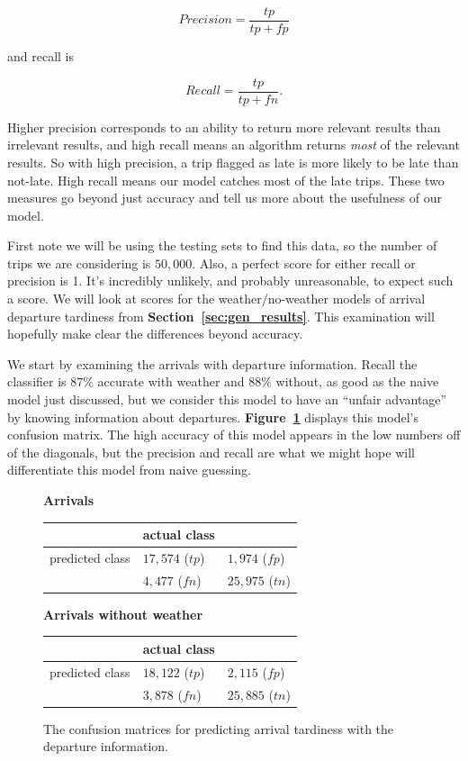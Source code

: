 \documentclass[11pt]{article} %
\begin{document}
\[Precision=\frac{tp}{tp+fp}\]

and recall is

\[Recall=\frac{tp}{tp+fn}.\]

Higher precision corresponds to an ability to return more relevant results than
irrelevant results, and high recall means an algorithm returns \textit{most} of
the relevant results.  So with high precision, a trip flagged as late is more 
likely to be late than not-late. High recall means our model catches most of
the late trips. These two measures go beyond just accuracy and tell us more about
the usefulness of our model.

First note we will be using the testing sets to find this data, so the number of 
trips we are considering is $50,000$. Also, a perfect score for either recall or
precision is 1. It's incredibly unlikely, and probably unreasonable, to expect 
such a score. We will look at scores for the weather/no-weather models of arrival
departure tardiness from \textbf{Section~\ref{sec:gen_results}}. This examination
will hopefully make clear the differences beyond accuracy.

We start by examining the arrivals with departure information. Recall the 
classifier is $87\%$ accurate with weather and $88\%$ without, as good as the
naive model just discussed, but we consider this model to have an 
``unfair advantage'' by knowing information about departures. 
\textbf{Figure~\ref{fig:confusion_arrivals}} displays this model's confusion
matrix.
The high accuracy of this model appears in the low numbers off of the diagonals,
but the precision and recall are what we might hope will differentiate this
model from naive guessing. 

\begin{figure}
    \textbf{Arrivals}

    \begin{tabular}[h]{l|ll}
                         & actual class &  \\
         \hline
         predicted class & $17,574 $ ($tp$)& $1,974$ ($fp$)\\
                         & $4,477$ ($fn$)& $25,975$ ($tn$)\\
    \end{tabular}

    \textbf{Arrivals without weather}

    \begin{tabular}[h]{l|ll}
                         & actual class &  \\
         \hline
         predicted class & $18,122$ ($tp$)& $2,115$ ($fp$)\\
                         & $3,878$ ($fn$)& $25,885$ ($tn$)\\
    \end{tabular}
    \caption{The confusion matrices for predicting arrival tardiness with
    the departure information.}
    \label{fig:confusion_arrivals}
\end{figure}
\end{document}
